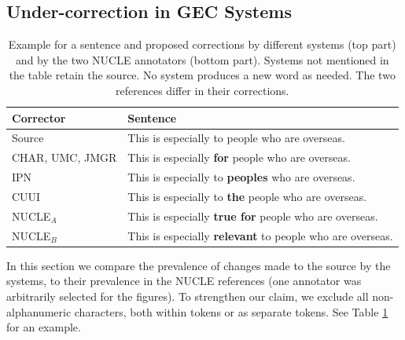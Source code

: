 \documentclass[a4paper]{article}
\begin{document}
\subsection{Under-correction in GEC Systems}\label{subsec:under-correction}
\begin{table}
	\centering
	\small
	\singlespacing
	\begin{tabular}{l|p{4cm}}
		Corrector & Sentence \\
		\hline
		Source & This is especially to people who are overseas. \\
		\hline 
		CHAR, UMC, JMGR & This is especially \textbf{for} people who are overseas. \\ 
		IPN & This is especially to \textbf{peoples} who are overseas. \\ 
		CUUI &  This is especially to \textbf{the} people who are overseas. \\ 
		\hline
		NUCLE$_A$ & This is especially \textbf{true for} people who are overseas.\\
		NUCLE$_B$ & This is especially \textbf{relevant} to people who are overseas.
	\end{tabular}
	\caption{\label{tab:nucle_example} Example for a sentence and proposed corrections by different systems (top part) and by the two NUCLE annotators (bottom part). Systems not mentioned in the table retain the source. No system produces a new word as needed. The two references differ in their corrections.} 
\end{table} 

In this section we compare the prevalence of changes made to the source by the systems,
to their prevalence in the NUCLE references (one annotator was arbitrarily 
selected for the figures). 
To strengthen our claim, we exclude all non-alphanumeric characters, 
both within tokens or as separate tokens. See Table \ref{tab:nucle_example} 
for an example.
\end{document}
